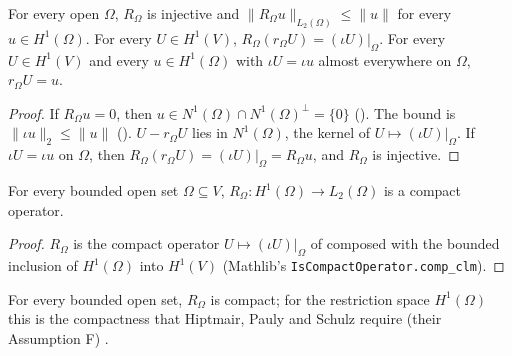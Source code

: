 \begin{proposition}
\label{prop:sobolev-restriction-l2}
\leanok
{}
For every open $\Omega$, $R_\Omega$ is injective and $\|R_\Omega u\|_{L_2(\Omega)} \leq \|u\|$
for every $u \in H^1(\Omega)$. For every $U \in H^1(V)$, $R_\Omega(r_\Omega U) =
(\iota U)|_\Omega$. For every $U \in H^1(V)$ and every $u \in H^1(\Omega)$ with
$\iota U = \iota u$ almost everywhere on $\Omega$, $r_\Omega U = u$.
\end{proposition}

\begin{proof}
\leanok
If $R_\Omega u = 0$, then $u \in N^1(\Omega) \cap N^1(\Omega)^\perp = \{0\}$
(). The bound is $\|\iota u\|_2 \leq \|u\|$
(). $U - r_\Omega U$ lies in $N^1(\Omega)$, the kernel of
$U \mapsto (\iota U)|_\Omega$. If $\iota U = \iota u$ on $\Omega$, then
$R_\Omega(r_\Omega U) = (\iota U)|_\Omega = R_\Omega u$, and $R_\Omega$ is injective.
\end{proof}

\begin{theorem}
\label{thm:sobolev-restriction-rellich}
\leanok
{}
For every bounded open set $\Omega \subseteq V$, $R_\Omega : H^1(\Omega) \to L_2(\Omega)$ is a
compact operator.
\end{theorem}

\begin{proof}
\leanok
$R_\Omega$ is the compact operator $U \mapsto (\iota U)|_\Omega$ of
 composed with the bounded inclusion of $H^1(\Omega)$ into
$H^1(V)$ (Mathlib's \texttt{IsCompactOperator.\allowbreak comp\_\allowbreak clm}).
\end{proof}

For every bounded open set, $R_\Omega$ is compact; for the restriction space $H^1(\Omega)$ this
is the compactness that Hiptmair, Pauly and Schulz require (their Assumption F)
\cite{HiptmairPaulySchulz}.

